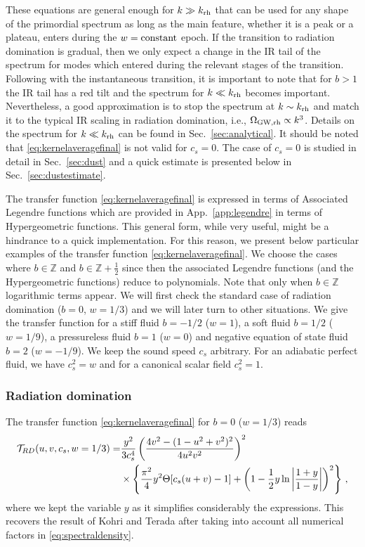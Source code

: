 \documentclass[a4paper,11pt]{article}
\numberwithin{equation}{section}
\begin{document}
These equations are general enough for $k\gg k_{\rm rh}$ that can be used for any shape of the primordial spectrum as long as the main feature, whether it is a peak or a plateau, enters during the $w={\rm constant}$ epoch. If the transition to radiation domination is gradual, then we only expect a change in the IR tail of the spectrum for modes which entered during the relevant stages of the transition. Following with the instantaneous transition, it is important to note that for $b>1$ the IR tail has a red tilt and the spectrum for $k\ll k_{\rm rh}$ becomes important. Nevertheless, a good approximation is to stop the spectrum at $k\sim k_{\rm rh}$ and match it to the typical IR scaling in radiation domination, i.e., $\Omega_{\rm GW,rh}\propto k^3$. Details on the spectrum for $k\ll k_{\rm rh}$ can be found in Sec.~\ref{sec:analytical}. It should be noted that \eqref{eq:kernelaveragefinal} is not valid for $c_s=0$. The case of $c_s=0$ is studied in detail in Sec.~\ref{sec:dust} and a quick estimate is presented below in Sec.~\ref{sec:dustestimate}.

The transfer function \eqref{eq:kernelaveragefinal} is expressed in terms of Associated Legendre functions which are provided in App.~\ref{app:legendre} in terms of Hypergeometric functions. This general form, while very useful, might be a hindrance to a quick implementation. For this reason, we present below particular examples of the transfer function \eqref{eq:kernelaveragefinal}. We choose the cases where $b\in \mathbb{Z}$ and $b\in \mathbb{Z}+\tfrac{1}{2}$ since then the associated Legendre functions (and the Hypergeometric functions) reduce to polynomials. Note that only when $b\in \mathbb{Z}$ logarithmic terms appear. We will first check the standard case of radiation domination ($b=0$, $w=1/3$) and we will later turn to other situations. We give the transfer function for a stiff fluid $b=-1/2$ ($w=1$), a soft fluid $b=1/2$ ($w=1/9$), a pressureless fluid $b=1$ ($w=0$) and negative equation of state fluid $b=2$ ($w=-1/9$). We keep the sound speed $c_s$ arbitrary. For an adiabatic perfect fluid, we have $c_s^2=w$ and for a canonical scalar field $c^2_s=1$.

\subsubsection{Radiation domination}
The transfer function \eqref{eq:kernelaveragefinal} for $b=0$ ($w=1/3$) reads
\begin{align}\label{eq:w13}
{\cal T}_{RD}(u,v,c_s,w=1/3)=&\frac{y^2}{3c_s^4}\left(\frac{4v^2-(1-u^2+v^2)^2}{4u^2v^2}\right)^2\nonumber\\&\times
\left\{\frac{\pi^2}{4}y^2\Theta[c_s(u+v)-1]
+\left(1-\frac{1}{2}y \ln\left|\frac{1+y}{1-y}\right|\right)^2\right\}\,,
\end{align}
where we kept the variable $y$ as it simplifies considerably the expressions. This recovers the result of Kohri and Terada \cite{Kohri:2018awv} after taking into account all numerical factors in \eqref{eq:spectraldensity}.
\end{document}
